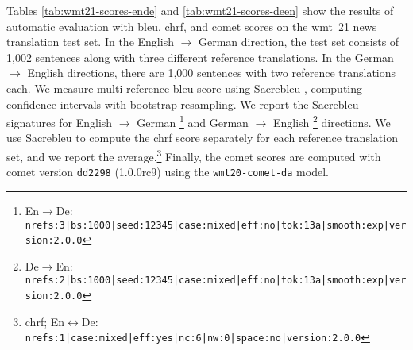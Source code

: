 Tables \ref{tab:wmt21-scores-ende} and \ref{tab:wmt21-scores-deen} show the
results of automatic evaluation with \acs{bleu}, \acs{chrf}, and \acs{comet}
scores on the \acs{wmt}~21 news translation test set. In the English
$\rightarrow$ German direction, the test set consists of 1,002 sentences along
with three different reference translations. In the German $\rightarrow$
English directions, there are 1,000 sentences with two reference translations
each. We measure multi-reference \acs{bleu} score using Sacrebleu
\citep{post-2018-call}, computing confidence intervals with bootstrap
resampling. We report the Sacrebleu signatures for English $\rightarrow$
German%
\footnote{En$\rightarrow$De: {\scriptsize
    \texttt{nrefs:3|bs:1000|seed:12345|case:mixed|eff:no|tok:13a|smooth:exp|version:2.0.0}}}
and German $\rightarrow$ English%
\footnote{De$\rightarrow$En: {\scriptsize
    \texttt{nrefs:2|bs:1000|seed:12345|case:mixed|eff:no|tok:13a|smooth:exp|version:2.0.0}}}
directions. We use Sacrebleu to compute the \acs{chrf} score separately for
each reference translation set, and we report the average.\footnote{\acs{chrf};
  En$\leftrightarrow$De: {\scriptsize
    \texttt{nrefs:1|case:mixed|eff:yes|nc:6|nw:0|space:no|version:2.0.0}}}
Finally, the \acs{comet} scores are computed with \acs{comet} version
\texttt{dd2298} (1.0.0rc9) using the \texttt{wmt20-comet-da} model.



